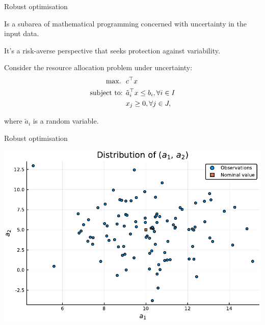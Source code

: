 \begin{frame}{Robust optimisation}
	
	Is a subarea of mathematical programming concerned with \alert{uncertainty in the input data}.
	
	It's a risk-averse perspective that seeks \alert{protection against variability}.
	
	\pause
	
	Consider the resource allocation problem under uncertainty:
	\begin{align*}
		\mathop{\text{max.} \ } \ &  c^\top x \\
		\mbox{subject to: } & \tilde{a}_{i}^\top x \leq b_i, \forall i \in I\\
		& x_j \geq 0, \forall j \in J,
	\end{align*}
	
	where $\tilde{a}_{i}$ is a \alert{random variable}.

\end{frame}


\begin{frame}{Robust optimisation}

	\includegraphics[width = 1\textwidth]{Figures/data_no_ellipsoid.pdf}

\end{frame}


